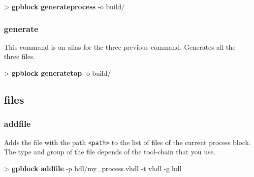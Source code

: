 \documentclass[10pt,a4paper]{article}
\begin{document}
\begin{sampletitle}
> \textbf{gpblock generateprocess} -o build/
\end{sampletitle}

\subsubsection{generate}

This command is an alias for the three previous command. Generates all the three files.\\


\begin{sampletitle}
> \textbf{gpblock generatetop} -o build/
\end{sampletitle}


\subsection{files}
\subsubsection{addfile}
\label{subsec:addfile}

Adds the file with the path \texttt{<path>} to the list of files of the current process block. The type and group of the file depends of the tool-chain that you use.\\


\begin{sampletitle}
> \textbf{gpblock addfile} -p hdl/my\_process.vhdl -t vhdl -g hdl
\end{sampletitle}
\end{document}
